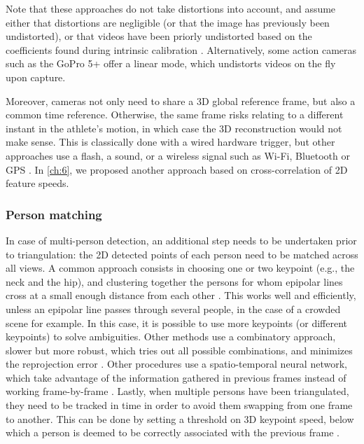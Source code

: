 Note that these approaches do not take distortions into account, and assume either that distortions are negligible (or that the image has previously been undistorted), or that videos have been priorly undistorted based on the coefficients found during intrinsic calibration \cite{Jackson2016}. Alternatively, some action cameras such as the GoPro 5+ offer a linear mode, which undistorts videos on the fly upon capture. 

Moreover, cameras not only need to share a 3D global reference frame, but also a common time reference. Otherwise, the same frame risks relating to a different instant in the athlete's motion, in which case the 3D reconstruction would not make sense. This is classically done with a wired hardware trigger, but other approaches use a flash, a sound, or a wireless signal such as Wi-Fi, Bluetooth or GPS \cite{GoPro2022}. In \autoref{ch:6}, we proposed another approach based on cross-correlation of 2D feature speeds.

\subsubsection{Person matching}  

In case of multi-person detection, an additional step needs to be undertaken prior to triangulation: the 2D detected points of each person need to be matched across all views. A common approach consists in choosing one or two keypoint (e.g., the neck and the hip), and clustering together the persons for whom epipolar lines cross at a small enough distance from each other \cite{Dong2019,Slembrouck2020,Kadkhodamohammadi2021}. This works well and efficiently, unless an epipolar line passes through several people, in the case of a crowded scene for example. In this case, it is possible to use more keypoints (or different keypoints) to solve ambiguities. Other methods use a combinatory approach, slower but more robust, which tries out all possible combinations, and minimizes the reprojection error \cite{Bridgeman2019,Chen2020c,Pagnon2021}. Other procedures use a spatio-temporal neural network, which take advantage of the information gathered in previous frames instead of working frame-by-frame \cite{Raaj2019}. Lastly, when multiple persons have been triangulated, they need to be tracked in time in order to avoid them swapping from one frame to another. This can be done by setting a threshold on 3D keypoint speed, below which a person is deemed to be correctly associated with the previous frame \cite{Bridgeman2019}.

